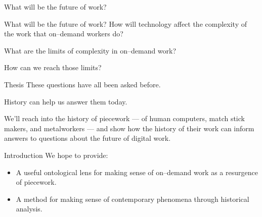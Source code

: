 \documentclass[presentation]{subfiles}
\begin{document}
\begin{frame}[standout]
    What will be the future of work?
\end{frame}

\begin{frame}{What will be the future of work?}
    How will \alert{technology} affect the complexity of the work that on--demand workers do?

    What are the \alert{limits} of complexity in on--demand work?

    How can we \alert{reach} those limits?
\end{frame}


\begin{frame}{Thesis}
    These questions have all been asked before.

    History can help us answer them today.

    We'll reach into the history of \alert{piecework}
    --- of human computers, match stick makers, and metalworkers ---
    and show how the \alert{history} of their work can
    inform answers to questions about the \alert{future} of digital work.
\end{frame}


\notinsubfile{
}


\begin{frame}{Introduction}
  We hope to provide:
      \begin{itemize}
        \item A useful ontological lens for making sense of on--demand work as a resurgence of \alert{piecework}.
        \item A method for making sense of contemporary phenomena through \alert{historical analysis}.
      \end{itemize}
\end{frame}
\end{document}
